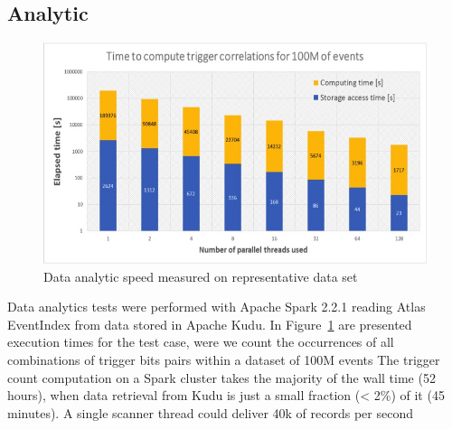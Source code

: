 \documentclass{webofc}
\begin{document}
\subsection{Analytic}
\label{sec-6-an}
\begin{figure}
\centering
\includegraphics[width=\linewidth,clip]{analytics.jpg}
\caption{Data analytic speed measured on representative data set}
\label{fig:analytics}
\end{figure}
Data analytics tests were performed with Apache Spark 2.2.1 reading Atlas EventIndex from data stored in Apache Kudu.
In Figure~\ref{fig:analytics} are presented execution times for the test case, were we count the occurrences of all combinations of trigger bits pairs within a dataset of 100M events
The trigger count computation on a Spark cluster takes the majority of the wall time (52 hours), when data retrieval from Kudu is just a small fraction (< 2\%) of it (45 minutes). A single scanner thread could deliver 40k of records per second
\end{document}
